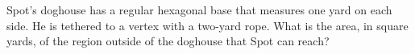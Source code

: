 Spot's doghouse has a regular hexagonal base that measures one yard on each side. He is tethered to a vertex with a two-yard rope. What is the area, in square yards, of the region outside of the doghouse that Spot can reach?
